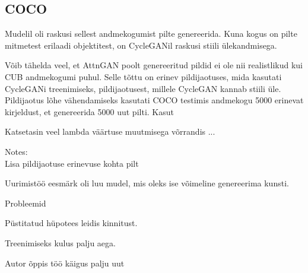 \documentclass{vilgym}
\begin{document}
	\subsection{COCO}
	Mudelil oli raskusi sellest andmekogumist pilte genereerida. Kuna kogus on pilte mitmetest erilaadi objektitest, on CycleGANil raskusi stiili ülekandmisega.

	Võib tähelda veel, et AttnGAN poolt genereeritud pildid ei ole nii realistlikud kui CUB andmekogumi puhul. Selle tõttu on erinev pildijaotuses, mida kasutati CycleGANi treenimiseks, pildijaotusest, millele CycleGAN kannab stiili üle. Pildijaotus lõhe vähendamiseks kasutati COCO testimis andmekogu 5000 erinevat kirjeldust, et genereerida 5000 uut pilti. Kasut

	Katsetasin veel lambda väärtuse muutmisega võrrandis ...

	Notes: \\
	Lisa pildijaotuse erinevuse kohta pilt

	Uurimistöö eesmärk oli luu mudel, mis oleks ise võimeline genereerima kunsti. 

	Probleemid

	Püstitatud hüpotees leidis kinnitust.

	Treenimiseks kulus palju aega.

	Autor õppis töö käigus palju uut


	\nocite{*} %
	\printbibliography[title={Kasutatud allikad}]
\end{document}
